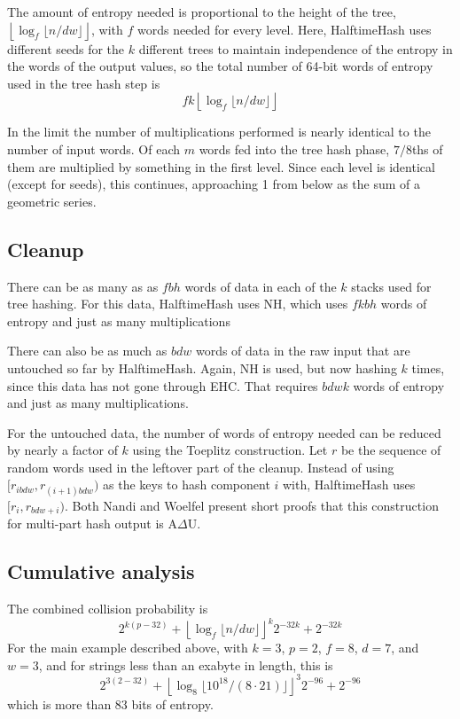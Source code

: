 \documentclass[sigconf, nonacm]{acmart}
\begin{document}
The amount of entropy needed is proportional to the height of the tree, $\left\lfloor\log_f \lfloor n/dw\rfloor\right\rfloor$, with $f$ words needed for every level.
Here, HalftimeHash uses different seeds for the $k$ different trees to maintain independence of the entropy in the words of the output values, so the total number of 64-bit words of entropy used in the tree hash step is \[f k\left\lfloor\log_f \lfloor n/dw\rfloor\right\rfloor\]

In the limit the number of multiplications performed is nearly identical to the number of input words.
Of each $m$ words fed into the tree hash phase, $7/8$ths of them are multiplied by something in the first level.
Since each level is identical (except for seeds), this continues, approaching 1 from below as the sum of a geometric series.

\subsection{Cleanup}

There can be as many as as $f b h$ words of data in each of the $k$ stacks used for tree hashing.
For this data, HalftimeHash uses NH, which uses $f k b h$ words of entropy and just as many multiplications

There can also be as much as $b d w$ words of data in the raw input that are untouched so far by HalftimeHash.
Again, NH is used, but now hashing $k$ times, since this data has not gone through EHC.
That requires $b d w k$ words of entropy and just as many multiplications.

For the untouched data, the number of words of entropy needed can be reduced by nearly a factor of $k$ using the Toeplitz construction. 
Let $r$ be the sequence of random words used in the leftover part of the cleanup.
Instead of using $[r_{ibdw}, r_{(i+1)bdw})$ as the keys to hash component $i$ with, HalftimeHash uses $[r_{i}, r_{bdw + i})$.
Both Nandi and Woelfel present short proofs that this construction for multi-part hash output is A$\Delta$U. \cite{ehc-nandi,woelfel-toeplitz}


\subsection{Cumulative analysis}

The combined collision probability is
\[2^{k(p-32)} + \left\lfloor \log_f \lfloor n / d w \rfloor \right\rfloor^k 2^{-32k} + 2^{-32k}\]
For the main example described above, with $k=3$, $p=2$, $f=8$, $d = 7$, and $w=3$, and for strings less than an exabyte in length, this is
\[2^{3(2-32)} + \left\lfloor \log_8 \lfloor 10^{18} /(8 \cdot 21) \rfloor \right\rfloor^3 2^{-96} + 2^{-96}\]
which is more than 83 bits of entropy.
\end{document}
